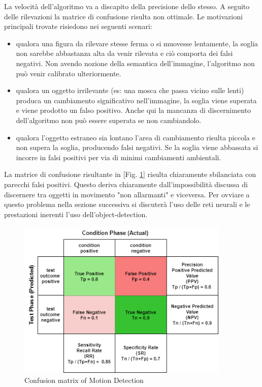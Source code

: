     La velocità dell'algoritmo va a discapito della precisione dello stesso. A seguito delle rilevazioni la matrice di confusione risulta non ottimale. Le motivazioni principali trovate risiedono nei seguenti scenari:
    \begin{itemize}
        \item qualora una figura da rilevare stesse ferma o si muovesse lentamente, la soglia non sarebbe abbastanza alta da venir rilevata e ciò comporta dei falsi negativi. Non avendo nozione della semantica dell'immagine, l'algoritmo non può venir calibrato ulteriormente.
        \item qualora un oggetto irrilevante (es: una mosca che passa vicino sulle lenti) produca un cambiamento significativo nell'immagine, la soglia viene superata e viene prodotto un falso positivo. Anche qui la mancanza di discernimento dell'algoritmo non può essere superata se non cambiandolo.
        \item qualora l'oggetto estraneo sia lontano l'area di cambiamento risulta piccola e non supera la soglia, producendo falsi negativi. Se la soglia viene abbassata si incorre in falsi positivi per via di minimi cambiamenti ambientali.
    \end{itemize}
    
    La matrice di confusione risultante in [Fig. \ref{fig:MDmatrix}] risulta chiaramente sbilanciata con parecchi falsi positivi. Questo deriva chiaramente dall'impossibilità discussa di discernere tra oggetti in movimento "non allarmanti" e viceversa.
    Per ovviare a questo problema nella sezione successiva si discuterà l'uso delle reti neurali e le prestazioni inerenti l'uso dell'object-detection.
    \begin{figure}[H]
        \caption{Confusion matrix of Motion Detection}
        \label{fig:MDmatrix}
        \centering
        \includegraphics[width=0.9\textwidth]{DrawIo/ConfusionMatrixMotDet.png}
    \end{figure}


